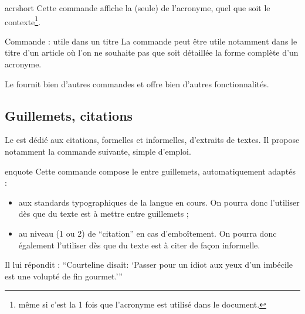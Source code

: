 \documentclass[french,nolocaltoc]{nwejmart}
\newtheorem[title=Fait,style=definition]{fact}
\begin{document}
\begin{docCommand}{acrshort}{}
  Cette commande affiche la  (seule) de l'acronyme, quel que
  soit le contexte\footnote{\Ie*{} même si c'est la 1\iere{} fois que l'acronyme
    est utilisé dans le document.}.
\end{docCommand}

\begin{dbremark}{Commande  : utile dans un titre}{}
  La commande  peut être utile notamment dans le titre d'un
  article où l'on ne souhaite pas que soit détaillée la forme complète d'un
  acronyme.
\end{dbremark}

Le  fournit bien d'autres commandes et offre bien d'autres
fonctionnalités\autocite[Pour plus de détails, cf. par exemple][]{Bitouze7}.

\subsection{Guillemets, citations}
\label{sec-guillemets-citations}

Le  est dédié aux citations, formelles et informelles,
d'extraits de textes. Il propose notamment la commande 
suivante, simple d'emploi.

\begin{docCommand}{enquote}{}
  Cette commande compose le  entre guillemets, automatiquement
  adaptés :
  \begin{itemize}
  \item aux standards typographiques de la langue en cours. On pourra donc
    l'utiliser dès que du texte est à mettre entre guillemets ;
  \item au niveau (1 ou 2) de \enquote{citation} en cas d'emboîtement. On
    pourra donc également l'utiliser dès que du texte est à citer de façon
    informelle.
  \end{itemize}
\begin{bodycode}
Il lui répondit : \enquote{Courteline disait: \enquote{Passer
    pour un idiot aux yeux d'un imbécile est une volupté de fin
    gourmet.}}
\end{bodycode}
\end{docCommand}
\end{document}
